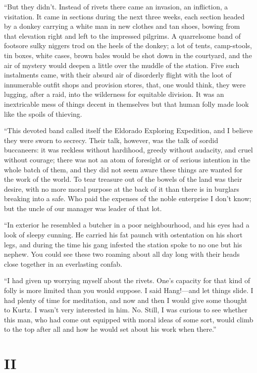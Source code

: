 \documentclass[12pt]{report}
\newcommand{\mychapter}[2]{
\setcounter{chapter}{#1}
    \setcounter{section}{0}
    \chapter*{#2}
    \addcontentsline{toc}{chapter}{#2}
}
\begin{document}
``But they didn't. Instead of rivets there came an invasion, an
infliction, a visitation. It came in sections during the next three
weeks, each section headed by a donkey carrying a white man in new
clothes and tan shoes, bowing from that elevation right and left to the
impressed pilgrims. A quarrelsome band of footsore sulky niggers trod on
the heels of the donkey; a lot of tents, camp-stools, tin boxes, white
cases, brown bales would be shot down in the courtyard, and the air of
mystery would deepen a little over the muddle of the station. Five such
instalments came, with their absurd air of disorderly flight with the
loot of innumerable outfit shops and provision stores, that, one would
think, they were lugging, after a raid, into the wilderness for
equitable division. It was an inextricable mess of things decent in
themselves but that human folly made look like the spoils of thieving.

``This devoted band called itself the Eldorado Exploring Expedition, and
I believe they were sworn to secrecy. Their talk, however, was the talk
of sordid buccaneers: it was reckless without hardihood, greedy without
audacity, and cruel without courage; there was not an atom of foresight
or of serious intention in the whole batch of them, and they did not
seem aware these things are wanted for the work of the world. To tear
treasure out of the bowels of the land was their desire, with no more
moral purpose at the back of it than there is in burglars breaking into
a safe. Who paid the expenses of the noble enterprise I don't know; but
the uncle of our manager was leader of that lot.

``In exterior he resembled a butcher in a poor neighbourhood, and his
eyes had a look of sleepy cunning. He carried his fat paunch with
ostentation on his short legs, and during the time his gang infested the
station spoke to no one but his nephew. You could see these two roaming
about all day long with their heads close together in an everlasting
confab.

``I had given up worrying myself about the rivets. One's capacity for
that kind of folly is more limited than you would suppose. I said
Hang!---and let things slide. I had plenty of time for meditation, and
now and then I would give some thought to Kurtz. I wasn't very
interested in him. No. Still, I was curious to see whether this man, who
had come out equipped with moral ideas of some sort, would climb to the
top after all and how he would set about his work when there.''

\mychapter{2}{II}\label{ii}
\end{document}
